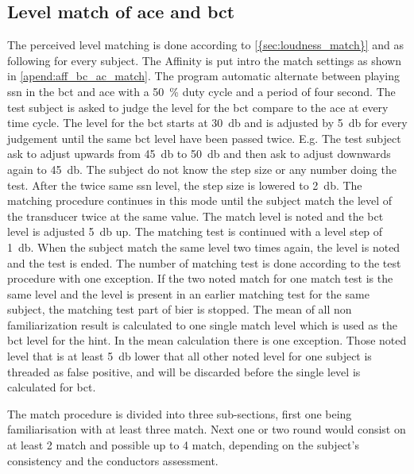 {\subsection{Level match of \gls{ace} and \gls{bct}}
The perceived level matching is done according to \autoref{{sec:loudness_match}} and as following for every subject. The Affinity is put intro the match settings as shown in \autoref{apend:aff_bc_ac_match}. The program automatic alternate between playing \gls{ssn} in the \gls{bct} and \gls{ace} with a \SI{50}{\percent} duty cycle and a period of four second. The test subject is asked to judge the level for the \gls{bct} compare to the \gls{ace} at every time cycle. The level for the \gls{bct} starts at \SI{30}{\decibel} and is adjusted by \SI{5}{\decibel} for every judgement until the same \gls{bct} level have been passed twice. E.g. The test subject ask to adjust upwards from \SI{45}{\decibel} to \SI{50}{\decibel} and then ask to adjust downwards again to \SI{45}{\decibel}. The subject do not know the step size or any number doing the test. After the twice same \gls{ssn} level, the step size is lowered to \SI{2}{\decibel}. The matching procedure continues in this mode until the subject match the level of the transducer twice at the same value. The match level is noted and the  \gls{bct} level is adjusted \SI{5}{\decibel} up. The matching test is continued with a level step of \SI{1}{\decibel}. When the subject match the same level two times again, the level is noted and the test is ended. The number of matching test is done according to the test procedure with one exception. If the two noted match for one match test is the same level and the level is present in an earlier matching test for the same subject, the matching test part of \gls{bier} is stopped. The mean of all non familiarization result is calculated to one single match level which is used as the \gls{bct} level for the \gls{hint}. In the mean calculation there is one exception. Those noted level that is at least \SI{5}{\decibel} lower that all other noted level for one subject is threaded as false positive, and will be discarded before the single level is calculated for \gls{bct}. 

The match procedure is divided into three sub-sections, first one being familiarisation with at least three match. Next one or two round would consist on at least 2 match and possible up to 4 match, depending on the subject's consistency and the conductors assessment. 


}
